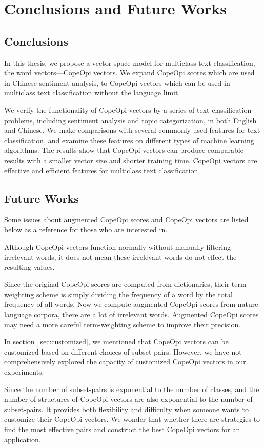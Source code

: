 \chapter{Conclusions and Future Works}
\section{Conclusions}
\par In this thesis, we propose a vector space model for multiclass text classification, the word vectors---CopeOpi vectors. We expand CopeOpi scores which are used in Chinese sentiment analysis, to CopeOpi vectors which can be used in multiclass text classification without the language limit.
\par We verify the functionality of CopeOpi vectors by a series of text classification problems, including sentiment analysis and topic categorization, in both English and Chinese. We make comparisons with several commonly-used features for text classification, and examine these features on different types of machine learning algorithms. The results show that CopeOpi vectors can produce comparable results with a smaller vector size and shorter training time. CopeOpi vectors are effective and efficient features for multiclass text classification.
\section{Future Works}
\par Some issues about augmented CopeOpi scores and CopeOpi vectors are listed below as a reference for those who are interested in.
~\newline
~\newline
{}
\par Although CopeOpi vectors function normally without manually filtering irrelevant words, it does not mean these irrelevant words do not effect the resulting values.
\par Since the original CopeOpi scores are computed from dictionaries, their term-weighting scheme is simply dividing the frequency of a word by the total frequency of all words. Now we compute augmented CopeOpi scores from nature language corpora, there are a lot of irrelevant words. Augmented CopeOpi scores may need a more careful term-weighting scheme to improve their precision.
~\newline
~\newline
{}
\par In section~\ref{sec:customized}, we mentioned that CopeOpi vectors can be customized based on different choices of subset-pairs. However, we have not comprehensively explored the capacity of  customized CopeOpi vectors in our experiments.
\par Since the number of subset-pairs is exponential to the number of classes, and the number of structures of CopeOpi vectors are also exponential to the number of subset-pairs. It provides both flexibility and difficulty when someone wants to customize their CopeOpi vectors. We wonder that whether there are strategies to find the most effective pairs and construct the best CopeOpi vectors for an application.